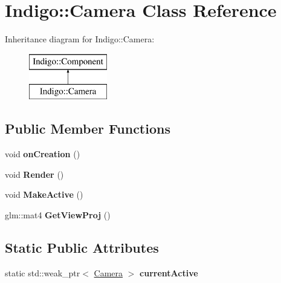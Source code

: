 \hypertarget{class_indigo_1_1_camera}{}\section{Indigo\+:\+:Camera Class Reference}
\label{class_indigo_1_1_camera}
Inheritance diagram for Indigo\+:\+:Camera\+:\begin{figure}[H]
\begin{center}
\leavevmode
\includegraphics[height=2.000000cm]{class_indigo_1_1_camera}
\end{center}
\end{figure}
\subsection*{Public Member Functions}
\begin{DoxyCompactItemize}
\item 
\mbox{\label{class_indigo_1_1_camera_a61d5d3693ed341d6ef8ce994ce0b866f}} 
void {\bfseries on\+Creation} ()
\item 
\mbox{\label{class_indigo_1_1_camera_ab99417d5df5a3126910d9b027a9af24b}} 
void {\bfseries Render} ()
\item 
\mbox{\label{class_indigo_1_1_camera_afc8bf89c0b9a82d72127ff7a6953cc1f}} 
void {\bfseries Make\+Active} ()
\item 
\mbox{\label{class_indigo_1_1_camera_a83f4ff3875e0e9b9f9521bd575be0312}} 
glm\+::mat4 {\bfseries Get\+View\+Proj} ()
\end{DoxyCompactItemize}
\subsection*{Static Public Attributes}
\begin{DoxyCompactItemize}
\item 
\mbox{\label{class_indigo_1_1_camera_a58aa0b63678256a9779fdb12a63ec401}} 
static std\+::weak\+\_\+ptr$<$ \hyperlink{class_indigo_1_1_camera}{Camera} $>$ {\bfseries current\+Active}
\end{DoxyCompactItemize}
